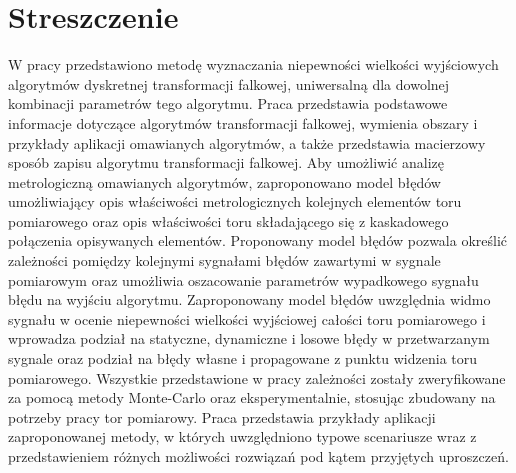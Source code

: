 \chapter*{Streszczenie}

W pracy przedstawiono metodę wyznaczania niepewności wielkości wyjściowych algorytmów dyskretnej transformacji falkowej, uniwersalną dla dowolnej kombinacji parametrów tego algorytmu. Praca przedstawia podstawowe informacje dotyczące algorytmów transformacji falkowej, wymienia obszary i przykłady aplikacji omawianych algorytmów, a także przedstawia macierzowy sposób zapisu algorytmu transformacji falkowej. Aby umożliwić analizę metrologiczną omawianych algorytmów, zaproponowano model błędów umożliwiający opis właściwości metrologicznych kolejnych elementów toru pomiarowego oraz opis właściwości toru składającego się z kaskadowego połączenia opisywanych elementów. Proponowany model błędów pozwala określić zależności pomiędzy kolejnymi sygnałami błędów zawartymi w sygnale pomiarowym oraz umożliwia oszacowanie parametrów wypadkowego sygnału błędu na wyjściu algorytmu. Zaproponowany model błędów uwzględnia widmo sygnału w ocenie niepewności wielkości wyjściowej całości toru pomiarowego i wprowadza podział na statyczne, dynamiczne i losowe błędy w przetwarzanym sygnale oraz podział na błędy własne i propagowane z punktu widzenia toru pomiarowego. Wszystkie przedstawione w pracy zależności zostały zweryfikowane za pomocą metody Monte-Carlo oraz eksperymentalnie, stosując zbudowany na potrzeby pracy tor pomiarowy. Praca przedstawia przykłady aplikacji zaproponowanej metody, w których uwzględniono typowe scenariusze wraz z przedstawieniem różnych możliwości rozwiązań pod kątem przyjętych uproszczeń.
